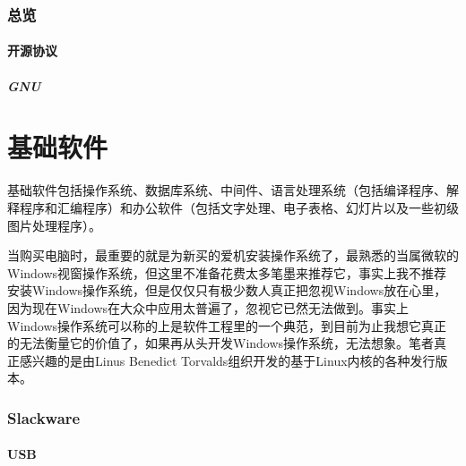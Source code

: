 \documentclass[paper=a4,fontsize=11pt]{article}
\begin{document}
	
	
	\newpage
	\section{总览}
	
	\subsection{开源协议}
	
	\subsubsection{GNU}
	
	
	
	\clearpage
	
	\part{基础软件}
	
	基础软件包括操作系统、数据库系统、中间件、语言处理系统（包括编译程序、解释程序和汇编程序）和办公软件（包括文字处理、电子表格、幻灯片以及一些初级图片处理程序）。
		
	\clearpage
	
	当购买电脑时，最重要的就是为新买的爱机安装操作系统了，最熟悉的当属微软的Windows视窗操作系统，但这里不准备花费太多笔墨来推荐它，事实上我不推荐安装Windows操作系统，但是仅仅只有极少数人真正把忽视Windows放在心里，因为现在Windows在大众中应用太普遍了，忽视它已然无法做到。事实上Windows操作系统可以称的上是软件工程里的一个典范，到目前为止我想它真正的无法衡量它的价值了，如果再从头开发Windows操作系统，无法想象。笔者真正感兴趣的是由Linus Benedict Torvalds组织开发的基于Linux内核的各种发行版本。
	
	\newpage
	
	\section{Slackware}
	
	\subsection{USB}
	
\end{document}
